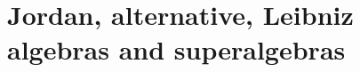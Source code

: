 \chapter{Jordan, alternative, Leibniz algebras and superalgebras}\label{ch:nonassociative}










